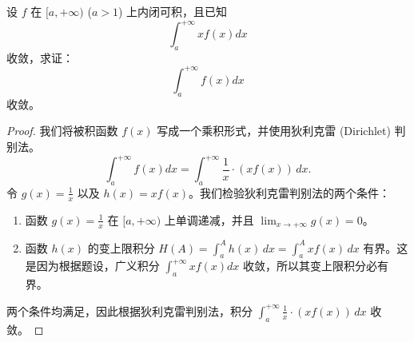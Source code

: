 \documentclass[lang=cn,10pt,thmcnt=section]{elegantbook}
\begin{document}
\begin{example}
	设 \( f \) 在 \([a, +\infty)\) (\( a > 1 \)) 上内闭可积，且已知  
\[
\int_a^{+\infty} x f(x) dx
\]  
收敛，求证：  
\[
\int_a^{+\infty} f(x) dx
\]  
收敛。
\end{example}
\begin{proof}
    我们将被积函数 $f(x)$ 写成一个乘积形式，并使用狄利克雷 (Dirichlet) 判别法。
    \[
    \int_a^{+\infty} f(x) dx = \int_a^{+\infty} \frac{1}{x} \cdot (x f(x)) \, dx.
    \]
    令 $g(x) = \frac{1}{x}$ 以及 $h(x) = x f(x)$。我们检验狄利克雷判别法的两个条件：
    \begin{enumerate}
        \item 函数 $g(x) = \frac{1}{x}$ 在 $[a, +\infty)$ 上单调递减，并且 $\lim_{x \to +\infty} g(x) = 0$。
        \item 函数 $h(x)$ 的变上限积分 $H(A) = \int_a^A h(x) \, dx = \int_a^A x f(x) \, dx$ 有界。这是因为根据题设，广义积分 $\int_a^{+\infty} x f(x) dx$ 收敛，所以其变上限积分必有界。
    \end{enumerate}
    两个条件均满足，因此根据狄利克雷判别法，积分 $\int_a^{+\infty} \frac{1}{x} \cdot (x f(x)) \, dx$ 收敛。
\end{proof}
\end{document}
